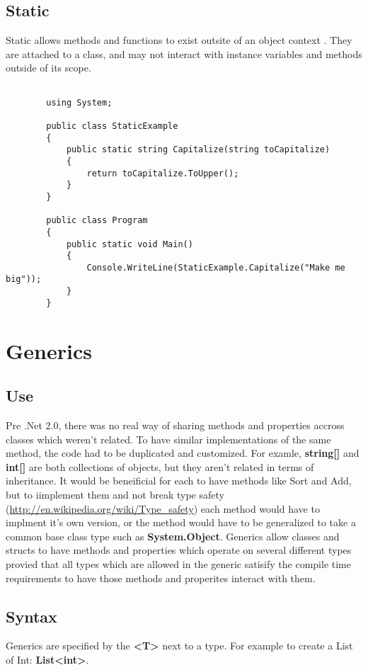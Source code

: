 \documentclass {amsart}
\begin{document}
	\subsection{Static}  Static allows methods and functions to exist outsite of an object context . They are attached to a class, and may not interact with instance variables and methods outside of its scope.  
		\begin{lstlisting}

		using System;

		public class StaticExample 
		{
			public static string Capitalize(string toCapitalize)
			{
				return toCapitalize.ToUpper();
			}
		}

		public class Program
		{
			public static void Main()
			{
				Console.WriteLine(StaticExample.Capitalize("Make me big"));
			}
		}

		\end{lstlisting}

	\section{Generics}
		\subsection{Use}  Pre .Net 2.0, there was no real way of sharing methods and properties accross classes which weren't related.  To have similar implementations of the same method, the code had to be duplicated and customized.  For examle, {\bf string[] } and {\bf int[]} are both collections of objects, but they aren't related in terms of inheritance.  It would be beneificial for each to have methods like Sort and Add, but to iimplement them and not break type safety (\url{http://en.wikipedia.org/wiki/Type_safety}) each method would have to implment it's own version, or the method would have to be generalized to take a common base class type such as {\bf System.Object}.  Generics allow classes and structs to have methods and properties which operate on several different types provied that all types which are allowed in the generic satisify the compile time requirements to have those methods and properites interact with them.  
		\subsection{Syntax}  Generics are specified by the {\bf \textless T\textgreater} next to a type.  For example to create a List of Int: {\bf List\textless int\textgreater}.  
\end{document}
